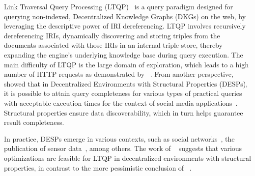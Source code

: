 Link Traversal Query Processing (LTQP)~\cite{Hartig2012} is a query paradigm designed for querying non-indexed, Decentralized Knowledge Graphs (DKGs) on the web, by leveraging the descriptive power of IRI dereferencing.
LTQP involves recursively dereferencing IRIs, dynamically discovering and storing triples from the documents associated with those IRIs in an internal triple store, thereby expanding the engine’s underlying knowledge base during query execution.
The main difficulty of LTQP is the large domain of exploration, which leads to a high number of HTTP requests as demonstrated by \citeauthor{hartig2016walking}~\cite{hartig2016walking}.
From another perspective, \citeauthor{Taelman2023}~\cite{Taelman2023} showed that in Decentralized Environments with Structural Properties (DESPs), it is possible to attain query completeness for various types of practical queries with acceptable execution times for the context of social media applications~\cite{nielsen1993response}.
Structural properties ensure data discoverability, which in turn helps guarantee result completeness.

In practice, DESPs emerge in various contexts, such as social networks~\cite{Taelman2023}, the publication of sensor data~\cite{tam_iswc_traversalsensortree_2024}, among others.
The work of \citeauthor{Taelman2023}~\cite{Taelman2023} suggests that various optimizations are feasible for LTQP in decentralized environments with structural properties, in contrast to the more pessimistic conclusion of \citeauthor{hartig2016walking}~\cite{hartig2016walking}.

